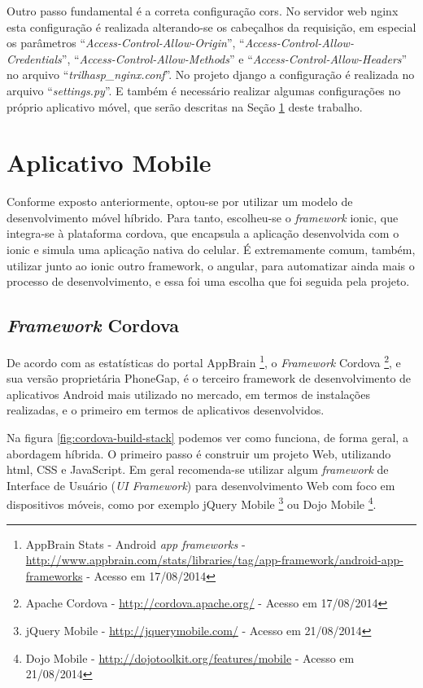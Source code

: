 Outro passo fundamental é a correta configuração \gls{cors}. No servidor web \gls{nginx} esta configuração é realizada alterando-se os cabeçalhos da requisição, em especial os parâmetros ``\textit{Access-Control-Allow-Origin}'', ``\textit{Access-Control-Allow-Credentials}'', ``\textit{Access-Control-Allow-Methods}'' e ``\textit{Access-Control-Allow-Headers}'' no arquivo ``\textit{trilhasp\_nginx.conf}''. No projeto \gls{django} a configuração é realizada no arquivo ``\textit{settings.py}''. E também é necessário realizar algumas configurações no próprio aplicativo móvel, que serão descritas na Seção \ref{sec:spec-appmobile} deste trabalho.

\section{Aplicativo Mobile}\label{sec:spec-appmobile}
Conforme exposto anteriormente, optou-se por utilizar um modelo de desenvolvimento móvel híbrido. Para tanto, escolheu-se o \textit{framework} \gls{ionic}, que integra-se à plataforma \gls{cordova}, que encapsula a aplicação desenvolvida com o \gls{ionic} e simula uma aplicação nativa do celular. É extremamente comum, também, utilizar junto ao \gls{ionic} outro framework, o \gls{angular}, para automatizar ainda mais o processo de desenvolvimento, e essa foi uma escolha que foi seguida pela projeto.

\subsection{\textit{Framework} Cordova}
De acordo com as estatísticas do portal AppBrain%
\footnote{AppBrain Stats - Android \textit{app frameworks} - \url{http://www.appbrain.com/stats/libraries/tag/app-framework/android-app-frameworks} - Acesso em 17/08/2014},
o \textit{Framework} Cordova%
\footnote{Apache Cordova - \url{http://cordova.apache.org/} - Acesso em 17/08/2014},
e sua versão proprietária PhoneGap, é o terceiro framework de desenvolvimento de aplicativos Android mais utilizado no mercado, em termos de instalações realizadas, e o primeiro em termos de aplicativos desenvolvidos.

Na figura \ref{fig:cordova-build-stack} podemos ver como funciona, de forma geral, a abordagem híbrida. O primeiro passo é construir um projeto Web, utilizando \gls{html}, CSS e JavaScript. Em geral recomenda-se utilizar algum \textit{framework} de Interface de Usuário (\textit{UI Framework}) para desenvolvimento Web com foco em dispositivos móveis, como por exemplo jQuery Mobile%
\footnote{jQuery Mobile - \url{http://jquerymobile.com/} - Acesso em 21/08/2014}
ou Dojo Mobile%
\footnote{Dojo Mobile - \url{http://dojotoolkit.org/features/mobile} - Acesso em 21/08/2014}.

